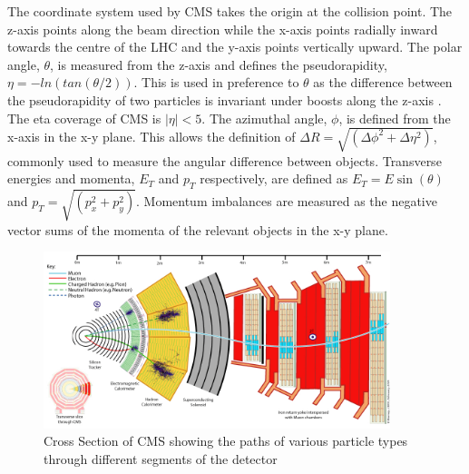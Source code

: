 The coordinate system used by CMS takes the origin at 
the collision point. The z-axis points along the beam direction while the x-axis points radially inward
towards the centre of the LHC and the y-axis points vertically upward.
The polar angle, $\theta$, is measured from the z-axis and defines the pseudorapidity, $\eta=-ln(tan(\theta/2))$. 
This is used in preference to $\theta$ as the difference between the pseudorapidity of two 
particles is invariant under boosts along the z-axis \cite{cms_iop}. 
The eta coverage of CMS is $|\eta|<5$. The azimuthal angle, $\phi$, is defined from the x-axis in the x-y plane.
This allows the definition of $\Delta R = \sqrt{(\Delta\phi^2+\Delta\eta^2)}$, commonly used to measure the 
angular difference between objects. Transverse energies and momenta, $E_T $ and $p_T$ respectively, are defined 
as $E_T = E\sin(\theta)$ and $p_T = \sqrt{(p_{x}^2+p_{y}^2)}$. Momentum imbalances are measured as the negative 
vector sums of the momenta of the relevant objects in the x-y plane. 

\begin{figure}
\centering
    \includegraphics[width=0.9\textwidth]{./Figures/detector/CMS_Slice.jpg}
  \caption{Cross Section of CMS showing the paths of various particle types 
  through different segments of the detector \cite{cmsslice}}
  \label{CMS_SLICE}
\end{figure}

